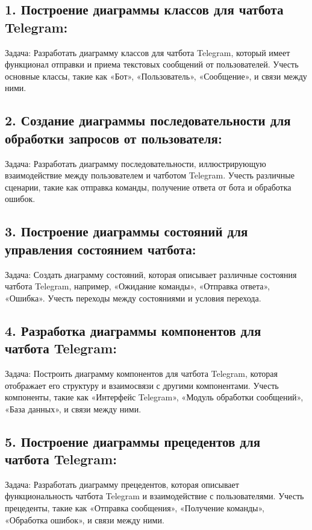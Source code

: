 \documentclass[letterpaper,10pt,russian]{sphinxmanual}
\begin{document}
\subsection{1. Построение диаграммы классов для чат\sphinxhyphen{}бота Telegram:}
\label{\detokenize{educational_materials/uml/exercises:telegram}}
\sphinxAtStartPar
Задача: Разработать диаграмму классов для чат\sphinxhyphen{}бота Telegram, который имеет функционал отправки и приема текстовых сообщений от пользователей. Учесть основные классы, такие как «Бот», «Пользователь», «Сообщение», и связи между ними.


\subsection{2. Создание диаграммы последовательности для обработки запросов от пользователя:}
\label{\detokenize{educational_materials/uml/exercises:id2}}
\sphinxAtStartPar
Задача: Разработать диаграмму последовательности, иллюстрирующую взаимодействие между пользователем и чат\sphinxhyphen{}ботом Telegram. Учесть различные сценарии, такие как отправка команды, получение ответа от бота и обработка ошибок.


\subsection{3. Построение диаграммы состояний для управления состоянием чат\sphinxhyphen{}бота:}
\label{\detokenize{educational_materials/uml/exercises:id3}}
\sphinxAtStartPar
Задача: Создать диаграмму состояний, которая описывает различные состояния чат\sphinxhyphen{}бота Telegram, например, «Ожидание команды», «Отправка ответа», «Ошибка». Учесть переходы между состояниями и условия перехода.


\subsection{4. Разработка диаграммы компонентов для чат\sphinxhyphen{}бота Telegram:}
\label{\detokenize{educational_materials/uml/exercises:id4}}
\sphinxAtStartPar
Задача: Построить диаграмму компонентов для чат\sphinxhyphen{}бота Telegram, которая отображает его структуру и взаимосвязи с другими компонентами. Учесть компоненты, такие как «Интерфейс Telegram», «Модуль обработки сообщений», «База данных», и связи между ними.


\subsection{5. Построение диаграммы прецедентов для чат\sphinxhyphen{}бота Telegram:}
\label{\detokenize{educational_materials/uml/exercises:id5}}
\sphinxAtStartPar
Задача: Разработать диаграмму прецедентов, которая описывает функциональность чат\sphinxhyphen{}бота Telegram и взаимодействие с пользователями. Учесть прецеденты, такие как «Отправка сообщения», «Получение команды», «Обработка ошибок», и связи между ними.
\end{document}
